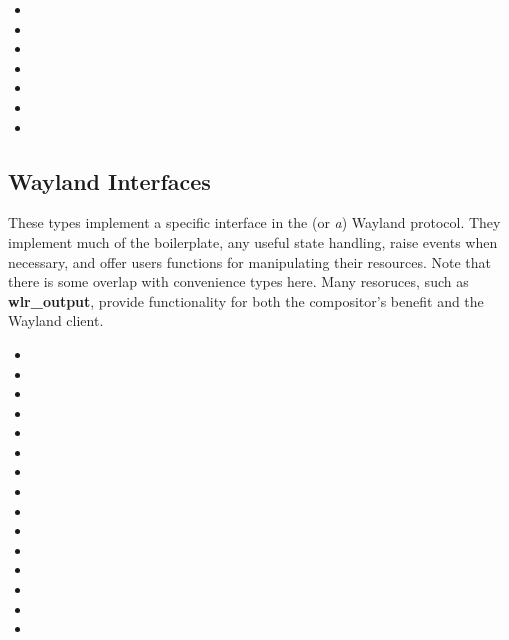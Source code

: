 \documentclass{article}
\begin{document}
\begin{itemize}
    \itemsep0em
    \item {}
    \item {}
    \item {}
    \item {}
    \item {}
    \item {}
    \item {}
\end{itemize}

\subsection{Wayland Interfaces}\label{wl interfaces}

These types implement a specific interface in the (or \emph{a}) Wayland
protocol. They implement much of the boilerplate, any useful state handling,
raise events when necessary, and offer users functions for manipulating their
resources. Note that there is some overlap with convenience types here. Many
resoruces, such as \textbf{wlr_output}, provide functionality for both the
compositor's benefit and the Wayland client.

\begin{itemize}
    \itemsep0em
    \item {}
    \item {}
    \item {}
    \item {}
    \item {}
    \item {}
    \item {}
    \item {}
    \item {}
    \item {}
    \item {}
    \item {}
    \item {}
    \item {}
    \item {}
\end{itemize}
\end{document}
